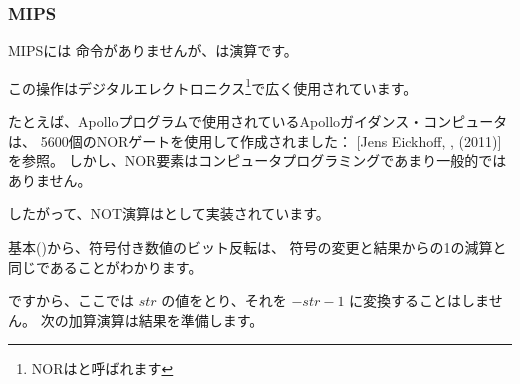 ﻿\subsubsection{MIPS}




MIPSには \NOT 命令がありませんが、\NOR は演算です。

この操作はデジタルエレクトロニクス\footnote{NORはと呼ばれます}で広く使用されています。 

たとえば、Apolloプログラムで使用されているApolloガイダンス・コンピュータは、
5600個のNORゲートを使用して作成されました：
[Jens Eickhoff, , (2011)]を参照。
しかし、NOR要素はコンピュータプログラミングであまり一般的ではありません。

したがって、NOT演算はとして実装されています。

基本()から、符号付き数値のビット反転は、
符号の変更と結果からの1の減算と同じであることがわかります。

ですから、ここでは $str$ の値をとり、それを $-str-1$ に変換することはしません。 
次の加算演算は結果を準備します。
